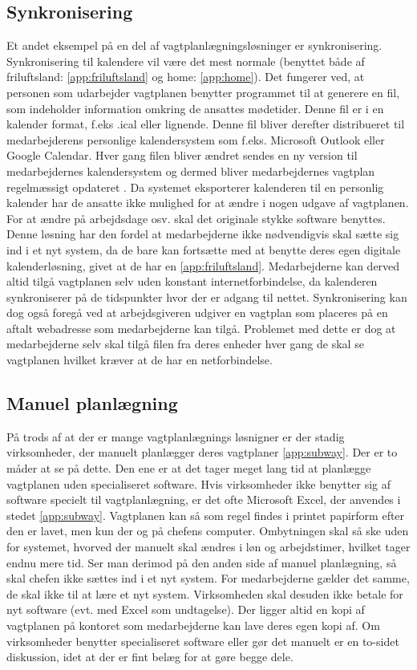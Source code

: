 \subsection{Synkronisering}
Et andet eksempel på en del af vagtplanlægningsløsninger er synkronisering. Synkronisering til kalendere vil være det mest normale (benyttet både af friluftsland: \ref{app:friluftsland} og home: \ref{app:home}). Det fungerer ved, at personen som udarbejder vagtplanen benytter programmet til at generere en fil, som indeholder information omkring de ansattes mødetider. Denne fil er i en kalender format, f.eks .ical eller lignende. Denne fil bliver derefter distribueret til medarbejderens personlige kalendersystem som f.eks. Microsoft Outlook eller Google Calendar. Hver gang filen bliver ændret sendes en ny version til medarbejdernes kalendersystem og dermed bliver medarbejdernes vagtplan regelmæssigt opdateret \citep{stage2005}. Da systemet eksporterer kalenderen til en personlig kalender har de ansatte ikke mulighed for at ændre i nogen udgave af vagtplanen. For at ændre på arbejdsdage osv. skal det originale stykke software benyttes. Denne løsning har den fordel at medarbejderne ikke nødvendigvis skal sætte sig ind i et nyt system, da de bare kan fortsætte med at benytte deres egen digitale kalenderløsning, givet at de har en \ref{app:friluftsland}. Medarbejderne kan derved altid tilgå vagtplanen selv uden konstant internetforbindelse, da kalenderen synkroniserer på de tidspunkter hvor der er adgang til nettet. Synkronisering kan dog også foregå ved at arbejdsgiveren udgiver en vagtplan som placeres på en aftalt webadresse som medarbejderne kan tilgå. Problemet med dette er dog at medarbejderne selv skal tilgå filen fra deres enheder hver gang de skal se vagtplanen hvilket kræver at de har en netforbindelse.\\

\subsection{Manuel planlægning}
På trods af at der er mange vagtplanlægnings løsnigner er der stadig virksomheder, der manuelt planlægger deres vagtplaner \ref{app:subway}. Der er to måder at se på dette. Den ene er at det tager meget lang tid at planlægge vagtplanen uden specialiseret software. Hvis virksomheder ikke benytter sig af software specielt til vagtplanlægning, er det ofte Microsoft Excel, der anvendes i stedet \ref{app:subway}. Vagtplanen kan så som regel findes i printet papirform efter den er lavet, men kun der og på chefens computer. Ombytningen skal så ske uden for systemet, hvorved der manuelt skal ændres i løn og arbejdstimer, hvilket tager endnu mere tid. Ser man derimod på den anden side af manuel planlægning, så skal chefen ikke sættes ind i et nyt system. For medarbejderne gælder det samme, de skal ikke til at lære et nyt system. Virksomheden skal desuden ikke betale for nyt software (evt. med Excel som undtagelse). Der ligger altid en kopi af vagtplanen på kontoret som medarbejderne kan lave deres egen kopi af. Om virksomheder benytter specialiseret software eller gør det manuelt er en to-sidet diskussion, idet at der er fint belæg for at gøre begge dele.


